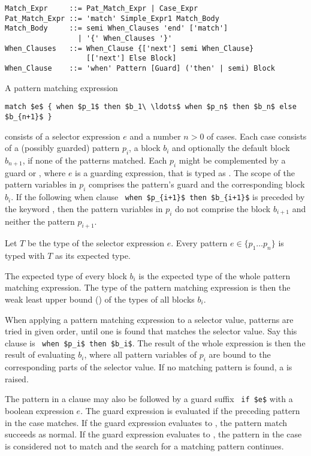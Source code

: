 \syntax\begin{lstlisting}
Match_Expr     ::= Pat_Match_Expr | Case_Expr
Pat_Match_Expr ::= 'match' Simple_Expr1 Match_Body
Match_Body     ::= semi When_Clauses 'end' ['match']
                 | '{' When_Clauses '}'
When_Clauses   ::= When_Clause {['next'] semi When_Clause} 
                   [['next'] Else Block]
When_Clause    ::= 'when' Pattern [Guard] ('then' | semi) Block
\end{lstlisting}

A pattern matching expression 
\begin{lstlisting}
match $e$ { when $p_1$ then $b_1\ \ldots$ when $p_n$ then $b_n$ else $b_{n+1}$ }
\end{lstlisting}
consists of a selector expression $e$ and a number $n > 0$ of cases. Each case consists of a (possibly guarded) pattern $p_i$, a block $b_i$ and optionally the default block $b_{n+1}$, if none of the patterns matched. Each $p_i$ might be complemented by a guard  or , where $e$ is a guarding expression, that is typed as . The scope of the pattern variables in $p_i$ comprises the pattern's guard and the corresponding block $b_i$. If the following when clause ~\lstinline!when $p_{i+1}$ then $b_{i+1}$! is preceded by the keyword , then the pattern variables in $p_i$ do not comprise the block $b_{i+1}$ and neither the pattern $p_{i+1}$. 

Let $T$ be the type of the selector expression $e$. Every pattern $e \in \{ p_1 \ldots p_n \}$ is typed with $T$ as its expected type. 

The expected type of every block $b_i$ is the expected type of the whole pattern matching expression. The type of the pattern matching expression is then the weak least upper bound () of the types of all blocks $b_i$. 

When applying a pattern matching expression to a selector value, patterns are tried in given order, until one is found that matches the selector value. Say this  clause is ~\lstinline!when $p_i$ then $b_i$!. The result of the whole expression is then the result of evaluating $b_i$, where all pattern variables of $p_i$ are bound to the corresponding parts of the selector value. If no matching pattern is found, a  is raised. 

The pattern in a  clause may also be followed by a guard suffix ~\lstinline!if $e$! with a boolean expression $e$. The guard expression is evaluated if the preceding pattern in the case matches. If the guard expression evaluates to , the pattern match succeeds as normal. If the guard expression evaluates to , the pattern in the case is considered not to match and the search for a matching pattern continues. 

